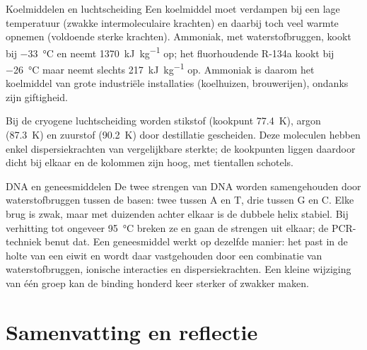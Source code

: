 \begin{toepassing}{Koelmiddelen en luchtscheiding}
Een koelmiddel moet verdampen bij een lage temperatuur (zwakke intermoleculaire krachten) en daarbij toch veel warmte opnemen (voldoende sterke krachten). Ammoniak, met waterstofbruggen, kookt bij \SI{-33}{\celsius} en neemt \SI{1370}{\kilo\joule\per\kilo\gram} op; het fluorhoudende R-134a kookt bij \SI{-26}{\celsius} maar neemt slechts \SI{217}{\kilo\joule\per\kilo\gram} op. Ammoniak is daarom het koelmiddel van grote industri\"ele installaties (koelhuizen, brouwerijen), ondanks zijn giftigheid.

Bij de cryogene luchtscheiding worden stikstof (kookpunt \SI{77.4}{\kelvin}), argon (\SI{87.3}{\kelvin}) en zuurstof (\SI{90.2}{\kelvin}) door destillatie gescheiden. Deze moleculen hebben enkel dispersiekrachten van vergelijkbare sterkte; de kookpunten liggen daardoor dicht bij elkaar en de kolommen zijn hoog, met tientallen schotels.
\end{toepassing}

\begin{toepassing}{DNA en geneesmiddelen}
De twee strengen van DNA worden samengehouden door waterstofbruggen tussen de basen: twee tussen A en T, drie tussen G en C. Elke brug is zwak, maar met duizenden achter elkaar is de dubbele helix stabiel. Bij verhitting tot ongeveer \SI{95}{\celsius} breken ze en gaan de strengen uit elkaar; de PCR-techniek benut dat. Een geneesmiddel werkt op dezelfde manier: het past in de holte van een eiwit en wordt daar vastgehouden door een combinatie van waterstofbruggen, ionische interacties en dispersiekrachten. Een kleine wijziging van \'e\'en groep kan de binding honderd keer sterker of zwakker maken.
\end{toepassing}

\section{Samenvatting en reflectie}

